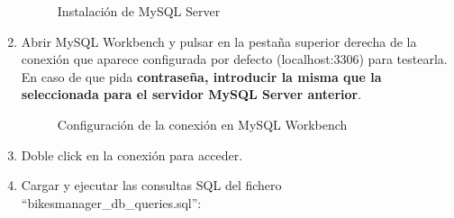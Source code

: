 \begin{enumerate}
\begin{figure} [!htb]
		\caption{Instalación de MySQL Server}
		\label{fig:mySQLInstallerServer_2}
	\end{figure}
	\FloatBarrier
	\item Abrir MySQL Workbench y pulsar en la pestaña superior derecha de la conexión que aparece configurada por defecto (localhost:3306) para testearla. En caso de que pida \textbf{contraseña, introducir la misma que la seleccionada para el servidor MySQL Server anterior}.
	\begin{figure} [!htb]
		\centering
		\caption{Configuración de la conexión en MySQL Workbench}
		\label{fig:mySQLWorkbench_1}
	\end{figure}
	\FloatBarrier
	\item Doble click en la conexión para acceder.
	\item Cargar y ejecutar las consultas SQL del fichero ``bikesmanager\_db\_queries.sql'':
	\begin{figure} [!htb]
		\centering

\end{figure}
\end{enumerate}
